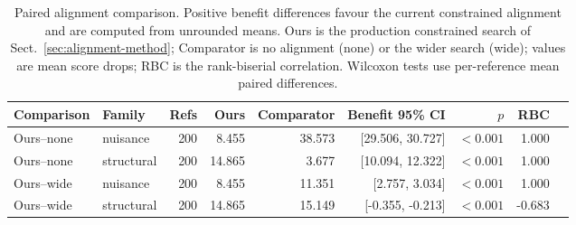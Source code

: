 \begin{table}[t]
\caption{Paired alignment comparison. Positive benefit differences favour the
current constrained alignment and are computed from unrounded means. Ours is
the production constrained search of Sect.~\ref{sec:alignment-method};
Comparator is no alignment (none) or the wider search (wide); values are
mean score drops; RBC is the rank-biserial correlation. Wilcoxon tests use
per-reference mean paired differences.}
\label{tab:alignment}
\centering
\footnotesize
\begin{tabular}{llrrrrrrr}
\toprule
Comparison & Family & Refs & Ours & Comparator & Benefit 95\% CI & $p$ & RBC \\
\midrule
Ours--none & nuisance & 200 & 8.455 & 38.573 & [29.506, 30.727] & \(<0.001\) & 1.000 \\
Ours--none & structural & 200 & 14.865 & 3.677 & [10.094, 12.322] & \(<0.001\) & 1.000 \\
Ours--wide & nuisance & 200 & 8.455 & 11.351 & [2.757, 3.034] & \(<0.001\) & 1.000 \\
Ours--wide & structural & 200 & 14.865 & 15.149 & [-0.355, -0.213] & \(<0.001\) & -0.683 \\
\bottomrule
\end{tabular}
\end{table}
